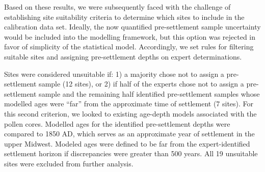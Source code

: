 \documentclass[12pt]{article}
\begin{document}
Based on these results, we were subsequently faced with the challenge
of establishing site suitability criteria to determine which sites to
include in the calibration data set. Ideally, the now quantified
pre-settlement sample uncertainty would be included into the modelling
framework, but this option was rejected in favor of simplicity of the
statistical model. Accordingly, we set rules for filtering suitable
sites and assigning pre-settlement depths on expert determinations.



Sites were considered unsuitable if: 1) a majority chose not to assign
a pre-settlement sample (12 sites), or 2) if half of the experts chose
not to assign a pre-settlement sample and the remaining half
identified pre-settlement samples whose modelled ages were “far” from
the approximate time of settlement (7 sites). For this second
criterion, we looked to existing age-depth models associated with the
pollen cores. Modelled ages for the identified pre-settlement depths
were compared to 1850 AD, which serves as an approximate year of
settlement in the upper Midwest.  Modeled ages were defined to be far
from the expert-identified settlement horizon if discrepancies were
greater than 500 years. All 19 unsuitable sites were excluded from further
analysis.
\end{document}
